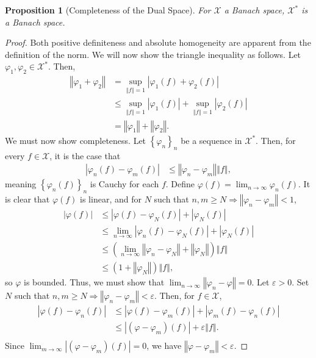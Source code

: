 \documentclass[10pt]{extarticle}
\newcommand{\norm}[1]{\left\Vert #1\right\Vert}
\newcommand{\set}[1]{\left\{#1\right\}}
\newcommand{\ve}{\varepsilon}
\theoremstyle{plain}
\newtheorem*{proposition}{Proposition}
\theoremstyle{definition}
\theoremstyle{note}
\begin{document}
\begin{proposition}[Completeness of the Dual Space]
  For $\mathcal{X}$ a Banach space, $\mathcal{X}^{\ast}$ is a Banach space.
\end{proposition}
\begin{proof}
  Both positive definiteness and absolute homogeneity are apparent from the definition of the norm. We will now show the triangle inequality as follows. Let $\varphi_1,\varphi_2\in \mathcal{X}^{\ast}$. Then,
  \begin{align*}
    \norm{\varphi_1 + \varphi_2} &= \sup_{\norm{f} = 1}\left\vert \varphi_1\left(f\right) +  \varphi_{2}\left(f\right)\right\vert\\
                                 &\leq \sup_{\norm{f} = 1}\left\vert \varphi_1(f) \right\vert + \sup_{\norm{f} = 1}\left\vert \varphi_2(f) \right\vert\\
                                 &= \norm{\varphi_1} + \norm{\varphi_2}.
  \end{align*}
  We must now show completeness. Let $\set{\varphi_n}_n$ be a sequence in $\mathcal{X}^{\ast}$. Then, for every $f\in \mathcal{X}$, it is the case that
  \begin{align*}
    \left\vert \varphi_n(f) - \varphi_m(f) \right\vert &\leq \norm{\varphi_n - \varphi_m}\norm{f},
  \end{align*}
  meaning $\set{\varphi_n(f)}_n$ is Cauchy for each $f$. Define $\varphi(f) = \lim_{n\rightarrow\infty}\varphi_n(f)$. It is clear that $\varphi(f)$ is linear, and for $N$ such that $n,m \geq N \Rightarrow \norm{\varphi_n - \varphi_m} < 1$,
  \begin{align*}
    \left\vert \varphi(f) \right\vert &\leq \left\vert \varphi(f) - \varphi_N(f) \right\vert + \left\vert \varphi_N(f) \right\vert\\
                                      &\leq \lim_{n\rightarrow\infty}\left\vert \varphi_n(f) - \varphi_N(f) \right\vert + \left\vert \varphi_N(f) \right\vert\\
                                      &\leq \left(\lim_{n\rightarrow\infty}\norm{\varphi_n - \varphi_N} + \norm{\varphi_N}\right)\norm{f}\\
                                      &\leq \left(1 + \norm{\varphi_N}\right)\norm{f},
  \end{align*}
  so $\varphi$ is bounded. Thus, we must show that $\lim_{n\rightarrow\infty}\norm{\varphi_n - \varphi} = 0$. Let $\ve > 0$. Set $N$ such that $n,m\geq N \Rightarrow \norm{\varphi_n - \varphi_m} < \ve$. Then, for $f\in \mathcal{X}$,
  \begin{align*}
    \left\vert \varphi(f) - \varphi_n(f) \right\vert &\leq \left\vert \varphi(f) - \varphi_m(f) \right\vert + \left\vert \varphi_m(f) - \varphi_n(f) \right\vert\\
                                                     &\leq \left\vert (\varphi - \varphi_m)(f) \right\vert + \ve\norm{f}.\\
  \end{align*}
  Since $\lim_{m\rightarrow\infty}\left\vert \left(\varphi - \varphi_m\right)(f) \right\vert = 0$, we have $\norm{\varphi - \varphi_m} < \ve$.
\end{proof}
\end{document}
